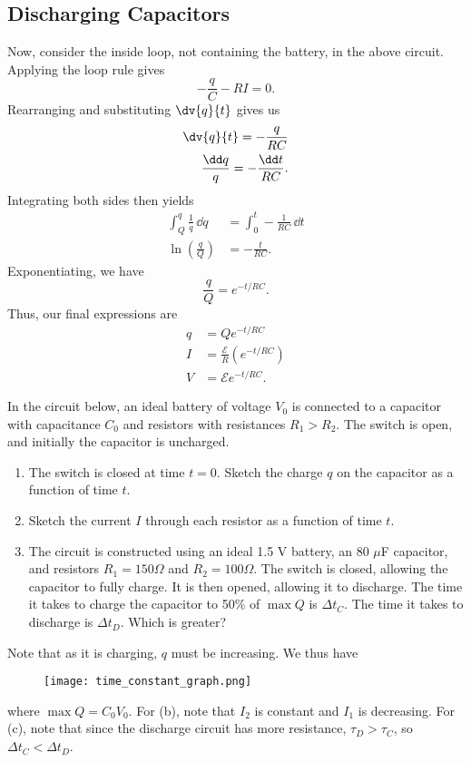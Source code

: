 \documentclass[11pt]{article}
\begin{document}
\subsection{Discharging Capacitors}
Now, consider the inside loop, not containing the battery, in the above circuit. Applying the loop rule gives
\[-\frac{q}{C} - RI = 0.\]
Rearranging and substituting $\dv{q}{t}$ gives us
\begin{align*}
    \dv{q}{t} = -\frac{q}{RC} \\
    \frac{\dd q}{q} = -\frac{\dd t}{RC}.
\end{align*}
Integrating both sides then yields
\begin{align*}
    \int_Q^q \frac{1}{q}\,\dd q &= \int_0^t -\frac{1}{RC}\,\dd t \\
    \ln(\frac{q}{Q}) &= -\frac{t}{RC}.
\end{align*}
Exponentiating, we have
\[\frac{q}{Q} = e^{-t/RC}.\]
Thus, our final expressions are
\begin{align}
    q &= Qe^{-t/RC} \\
    I &= \frac{\mathcal{E}}{R}(e^{-t/RC}) \\
    V &= \mathcal{E}e^{-t/RC}.
\end{align}
\begin{example}
    In the circuit below, an ideal battery of voltage $V_0$ is connected to a capacitor with capacitance $C_0$ and resistors with resistances $R_1 > R_2$. The switch is open, and initially the capacitor is uncharged.
    \begin{enumerate}[label=(\alph*)]
        \item The switch is closed at time $t = 0$. Sketch the charge $q$ on the capacitor as a function of time $t$.
        \item Sketch the current $I$ through each resistor as a function of time $t$.
        \item The circuit is constructed using an ideal 1.5 V battery, an 80 $\mu$F capacitor, and resistors $R_1 = 150\Omega$ and $R_2 = 100\Omega$. The switch is closed, allowing the capacitor to fully charge. It is then opened, allowing it to discharge. The time it takes to charge the capacitor to 50\% of $\max Q$ is $\Delta t_C$. The time it takes to discharge is $\Delta t_D$. Which is greater?
    \end{enumerate}
\end{example}
\begin{solution}
    Note that as it is charging, $q$ must be increasing. We thus have
    \begin{figure*}[h!]
        \centering
        \texttt{[image: time\_constant\_graph.png]}
    \end{figure*}
    
    where $\max Q = C_0V_0$. For (b), note that $I_2$ is constant and $I_1$ is decreasing. For (c), note that since the discharge circuit has more resistance, $\tau_D > \tau_C$, so $\boxed{\Delta t_C < \Delta t_D}$.
\end{solution}
\end{document}

